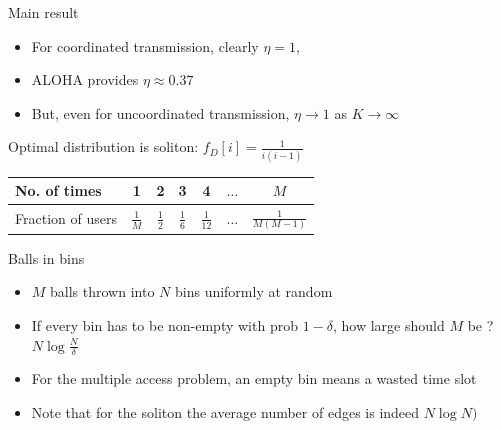 \begin{frame}{Main result}
\begin{block}{}
\begin{itemize}
\item For coordinated transmission, clearly $\eta = 1$,
\pause
\item ALOHA provides $\eta \approx 0.37$
\pause
\item But, even for uncoordinated transmission, $\eta \rightarrow 1$ as $K \rightarrow \infty$
\end{itemize}
\end{block}
\pause
\begin{block}{Optimal distribution is soliton: $f_D[i] = \frac{1}{i(i-1)}$}
\begin{center}
\begin{tabular}{|l|c|c|c|c|c|c|}
\hline
No. of times & 1 & 2 & 3 & 4 & $\ldots$ & $M$ \\
\hline
Fraction of users & $\frac{1}{M}$ & $\frac12$ & $\frac16$ & $\frac{1}{12}$ & $\ldots$ & $\frac{1}{M (M-1)}$ \\
\hline
\end{tabular}
\end{center}
\end{block}
\end{frame}
\begin{frame}{Balls in bins}
\begin{itemize}
  \item $M$ balls thrown into $N$ bins uniformly at random
  \item If every bin has to be non-empty with prob $1-\delta$, how large should $M$ be ? \pause $\boxed{N \log \frac{N}{\delta}}$
  \item For the multiple access problem, an empty bin means a wasted time slot
  \item Note that for the soliton the average number of edges is indeed $N \log N)$
\end{itemize}
\end{frame}
